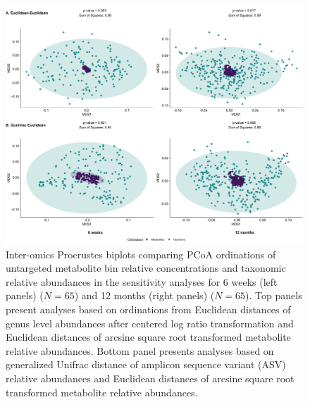 \begin{figure}[!h]
    \centering
    \includegraphics[width=0.95\linewidth]{figures/appB_fs6.png}
    \caption[Inter-omics Procrustes biplots comparing PCoA ordinations of untargeted metabolite bin relative concentrations and taxonomic relative abundances in the sensitivity analyses for 6 weeks (left panels) ($N = 65$) and 12 months (right panels) ($N = 65$)]{Inter-omics Procrustes biplots comparing PCoA ordinations of untargeted metabolite bin relative concentrations and taxonomic relative abundances in the sensitivity analyses for 6 weeks (left panels) ($N = 65$) and 12 months (right panels) ($N = 65$). Top panels present analyses based on ordinations from Euclidean distances of genus level abundances after centered log ratio transformation and Euclidean distances of arcsine square root transformed metabolite relative abundances. Bottom panel presents analyses based on generalized Unifrac distance of amplicon sequence variant (ASV) relative abundances and Euclidean distances of arcsine square root transformed metabolite relative abundances.}
    \label{fig:b6}
\end{figure}

